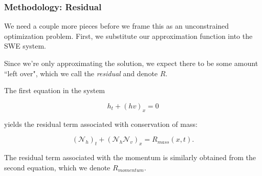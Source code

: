 \begin{frame}
    \frametitle{Methodology: Residual}

    We need a couple more pieces before we frame this as an unconstrained optimization problem. First, we substitute 
    our approximation function into the SWE system. 

    \bigskip
    \pause

    Since we're only approximating the solution, we expect there to be some amount ``left over", which we call the 
    \textit{residual} and denote $R$. 
    
    \bigskip
    \pause

    The first equation in the system 
    
    $$
    h_t + (hv)_x = 0
    $$
    
    yields the residual term associated with conservation of mass:

    $$
    \left( \mathcal{N}_h \right)_t + \left( \mathcal{N}_h \mathcal{N}_v \right)_x = R_{mass}(x, t).
    $$

    \bigskip
    \pause

    The residual term associated with the momentum is similarly obtained from the second equation, which we denote 
    $R_{momentum}$.
\end{frame}